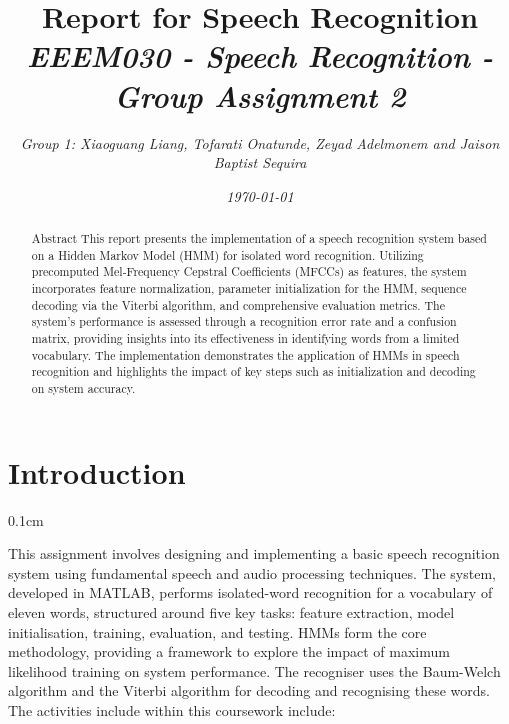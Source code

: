 \documentclass{article}
\newcommand{\setParDis}{\setlength {\parskip} {0.1cm} } %
\begin{document}
\title{%
Report for Speech Recognition \\
\large\itshape{EEEM030 - Speech Recognition - Group Assignment 2}}
\author{\normalsize\slshape{Group 1: Xiaoguang Liang, Tofarati Onatunde, Zeyad Adelmonem and Jaison Baptist Sequira}}
\date{\normalsize\slshape\today}
\maketitle



\tableofcontents

\begin{abstract}
Abstract
This report presents the implementation of a speech recognition system based on a Hidden Markov Model (HMM) for isolated word recognition. Utilizing precomputed Mel-Frequency Cepstral Coefficients (MFCCs) as features, the system incorporates feature normalization, parameter initialization for the HMM, sequence decoding via the Viterbi algorithm, and comprehensive evaluation metrics. The system’s performance is assessed through a recognition error rate and a confusion matrix, providing insights into its effectiveness in identifying words from a limited vocabulary. The implementation demonstrates the application of HMMs in speech recognition and highlights the impact of key steps such as initialization and decoding on system accuracy.

\end{abstract}


\section{Introduction}
\setParDis

This assignment involves designing and implementing a basic speech recognition system using fundamental speech and audio processing techniques. The system, developed in MATLAB, performs isolated-word recognition for a vocabulary of eleven words, structured around five key tasks: feature extraction, model initialisation, training, evaluation, and testing. HMMs form the core methodology, providing a framework to explore the impact of maximum likelihood training on system performance. The recogniser uses the Baum-Welch algorithm and the Viterbi algorithm for decoding and recognising these words. The activities include within this coursework include:
\end{document}
